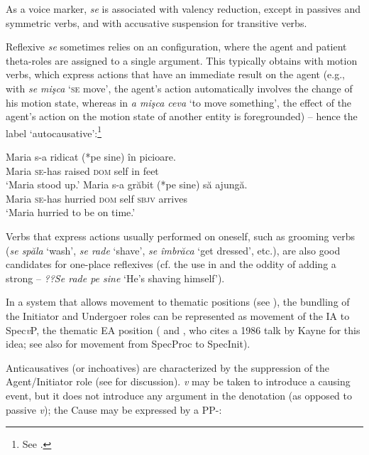 \documentclass[output=paper]{langsci/langscibook}
\begin{document}
As a voice marker, \textit{se} is associated with valency reduction, except in passives and symmetric verbs, and with accusative suspension for transitive verbs.

Reflexive \textit{se} sometimes relies on an  configuration, where the agent and patient theta-roles are assigned to a single argument. This typically obtains with motion verbs, which express actions that have an immediate result on the agent (e.g., with \textit{se mişca} ‘\textsc{se} move’, the agent’s action automatically involves the change of his motion state, whereas in \textit{a mişca ceva} ‘to move something’, the effect of the agent’s action on the motion state of another entity is foregrounded) – hence the label ‘autocausative':\footnote{See \citet{Geniušienė1987}.} 

\ea%
    \label{ex:giurgea:56}
    \ea
    \gll Maria s-a      ridicat (*pe     sine) în picioare.\\
          Maria \textsc{se-}has raised     \textsc{dom} self   in feet\\
    \glt ‘Maria stood up.’
    \ex
    \gll Maria s-a        grăbit   (*pe     sine)   să     ajungă.\\
          Maria \textsc{se-}has  hurried    \textsc{dom}  self    \textsc{sbjv} arrives \\
    \glt ‘Maria hurried to be on time.’ 
\z
\z

Verbs that express actions usually performed on oneself, such as grooming verbs (\textit{se spăla} ‘wash’, \textit{se rade} ‘shave’, \textit{se îmbrăca} ‘get dressed’, etc.), are also good candidates for one-place reflexives (cf. the  use in  and the oddity of adding a strong  – \textit{??Se rade pe sine} ‘He’s shaving himself’).

In a system that allows movement to thematic positions (see \citealt{Hornstein1999,Ramchand2008}), the bundling of the Initiator and Undergoer roles can be represented as movement of the IA to Spec\textit{v}P, the thematic EA position (\citealt{Alboiu2004} and \citealt{Medová2009}, who cites a 1986 talk by Kayne for this idea; see also \citealt{Ramchand2008} for movement from SpecProc to SpecInit).

Anticausatives (or inchoatives) are characterized by the suppression of the Agent\slash Initiator role (see \citealt{Schäfer2008} for discussion). \textit{v} may be taken to introduce a causing event, but it does not introduce any argument in the denotation (as opposed to passive \textit{v}); the Cause may be expressed by a PP-: 
\end{document}
